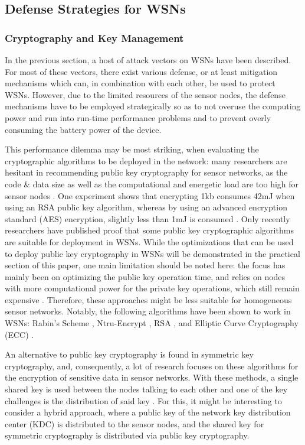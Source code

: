 \documentclass[12pt,a4paper,twoside]{report}
\begin{document}
\subsection{Defense Strategies for WSNs}
\subsubsection{Cryptography and Key Management}
In the previous section, a host of attack vectors on WSNs have been described. For most of these vectors, there exist various defense, or at least mitigation mechanisms which can, in combination with each other, be used to protect WSNs. However, due to the limited resources of the sensor nodes,  the defense mechanisms have to be employed strategically so as to not overuse the computing power and run into run-time performance problems and to prevent overly consuming the battery power of the device.\par
This performance dilemma may be most striking, when evaluating the cryptographic algorithms to be deployed in the network: many researchers are hesitant in recommending public key cryptography for sensor networks, as the code \& data size as well as the computational and energetic load are too high for sensor nodes \cite{sen:2009}. One experiment shows that encrypting 1kb consumes 42mJ when using an RSA public key  algorithm, whereas by using an advanced encryption standard (AES) encryption, slightly less than 1mJ is consumed \cite{sen:2009}. Only recently researchers have published proof that some public key cryptographic algorithms are suitable for deployment in WSNs. While the optimizations that can be used to deploy public key cryptography in WSNs will be demonstrated in the practical section of this paper, one main limitation should be noted here: the focus has mainly been on optimizing the public key operation time, and relies on nodes with more computational power for the private key operations, which still remain expensive \cite{sen:2009}. Therefore, these approaches might be less suitable for homogeneous sensor networks. Notably, the following algorithms have been shown to work in WSNs: Rabin's Scheme \cite{rabin:1979}, Ntru-Encrypt \cite{hoffstein;etal:1998}, RSA \cite{RSA:1983}, and Elliptic Curve Cryptography (ECC)\cite{miller:1986} \cite{kobiltz:1987}.\par
An alternative to public key cryptography is found in symmetric key cryptography, and, consequently, a lot of research focuses on these algorithms for the encryption of sensitive data in sensor networks. With these methods, a single shared key is used between the nodes talking to each other and one of the key challenges is the distribution of said key \cite{sen:2009}. For this, it might be interesting to consider a hybrid approach, where a public key of the network key distribution center (KDC) is distributed to the sensor nodes, and the shared key for symmetric cryptography is distributed via public key cryptography.\par
\end{document}
